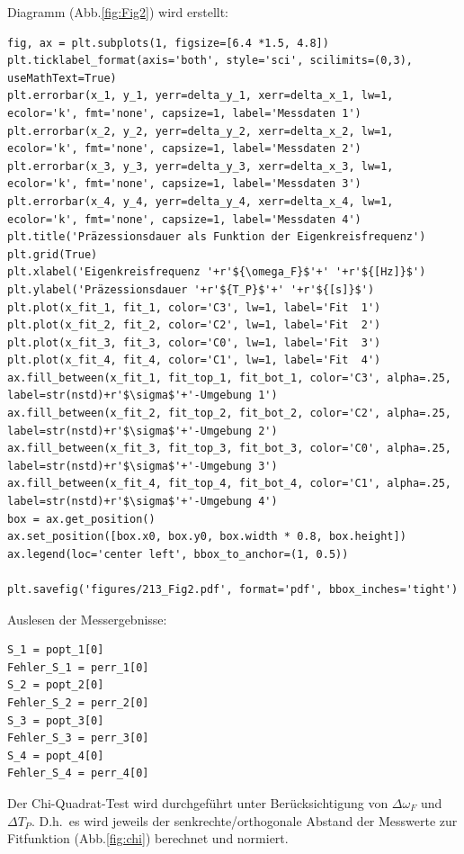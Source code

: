 \documentclass[a4paper,10pt]{article}
\begin{document}
Diagramm (Abb.\ref{fig:Fig2}) wird erstellt:\begin{lstlisting}
fig, ax = plt.subplots(1, figsize=[6.4 *1.5, 4.8])
plt.ticklabel_format(axis='both', style='sci', scilimits=(0,3), useMathText=True)
plt.errorbar(x_1, y_1, yerr=delta_y_1, xerr=delta_x_1, lw=1, ecolor='k', fmt='none', capsize=1, label='Messdaten 1')
plt.errorbar(x_2, y_2, yerr=delta_y_2, xerr=delta_x_2, lw=1, ecolor='k', fmt='none', capsize=1, label='Messdaten 2')
plt.errorbar(x_3, y_3, yerr=delta_y_3, xerr=delta_x_3, lw=1, ecolor='k', fmt='none', capsize=1, label='Messdaten 3')
plt.errorbar(x_4, y_4, yerr=delta_y_4, xerr=delta_x_4, lw=1, ecolor='k', fmt='none', capsize=1, label='Messdaten 4')
plt.title('Präzessionsdauer als Funktion der Eigenkreisfrequenz')
plt.grid(True)
plt.xlabel('Eigenkreisfrequenz '+r'${\omega_F}$'+' '+r'${[Hz]}$')
plt.ylabel('Präzessionsdauer '+r'${T_P}$'+' '+r'${[s]}$')
plt.plot(x_fit_1, fit_1, color='C3', lw=1, label='Fit  1')
plt.plot(x_fit_2, fit_2, color='C2', lw=1, label='Fit  2')
plt.plot(x_fit_3, fit_3, color='C0', lw=1, label='Fit  3')
plt.plot(x_fit_4, fit_4, color='C1', lw=1, label='Fit  4')
ax.fill_between(x_fit_1, fit_top_1, fit_bot_1, color='C3', alpha=.25, label=str(nstd)+r'$\sigma$'+'-Umgebung 1')
ax.fill_between(x_fit_2, fit_top_2, fit_bot_2, color='C2', alpha=.25, label=str(nstd)+r'$\sigma$'+'-Umgebung 2')
ax.fill_between(x_fit_3, fit_top_3, fit_bot_3, color='C0', alpha=.25, label=str(nstd)+r'$\sigma$'+'-Umgebung 3')
ax.fill_between(x_fit_4, fit_top_4, fit_bot_4, color='C1', alpha=.25, label=str(nstd)+r'$\sigma$'+'-Umgebung 4')
box = ax.get_position()
ax.set_position([box.x0, box.y0, box.width * 0.8, box.height])
ax.legend(loc='center left', bbox_to_anchor=(1, 0.5))

plt.savefig('figures/213_Fig2.pdf', format='pdf', bbox_inches='tight')

\end{lstlisting}

Auslesen der Messergebnisse:\begin{lstlisting}
S_1 = popt_1[0]
Fehler_S_1 = perr_1[0]
S_2 = popt_2[0]
Fehler_S_2 = perr_2[0]
S_3 = popt_3[0]
Fehler_S_3 = perr_3[0]
S_4 = popt_4[0]
Fehler_S_4 = perr_4[0]

\end{lstlisting}

Der Chi-Quadrat-Test wird durchgeführt unter Berücksichtigung von \(\Delta \omega_F\) und \(\Delta T_P\). D.h.~es wird jeweils der senkrechte/orthogonale Abstand der Messwerte zur Fitfunktion (Abb.\ref{fig:chi}) berechnet und normiert\fnrefa.
\end{document}
